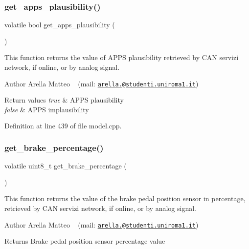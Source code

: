 \subsubsection{\texorpdfstring{get\+\_\+apps\+\_\+plausibility()}{get\_apps\_plausibility()}}
{\footnotesize\ttfamily volatile bool get\+\_\+apps\+\_\+plausibility (\begin{DoxyParamCaption}{ }\end{DoxyParamCaption})}



This function returns the value of A\+P\+PS plausibility retrieved by C\+AN servizi network, if online, or by analog signal. 

\begin{DoxyAuthor}{Author}
Arella Matteo ~\newline
 (mail\+: \href{mailto:arella.1646983@studenti.uniroma1.it}{\tt arella.@studenti.\+uniroma1.\+it})
\end{DoxyAuthor}

\begin{DoxyRetVals}{Return values}
{\em true} & A\+P\+PS plausibility \\
\hline
{\em false} & A\+P\+PS implausibility \\
\hline
\end{DoxyRetVals}


Definition at line 439 of file model.\+cpp.

\mbox{\label{group___board__model__group_ga6db41e7368919bc4dfafaf4e400ae1a9}} 
\subsubsection{\texorpdfstring{get\+\_\+brake\+\_\+percentage()}{get\_brake\_percentage()}}
{\footnotesize\ttfamily volatile uint8\+\_\+t get\+\_\+brake\+\_\+percentage (\begin{DoxyParamCaption}{ }\end{DoxyParamCaption})}



This function returns the value of the brake pedal position sensor in percentage, retrieved by C\+AN servizi network, if online, or by analog signal. 

\begin{DoxyAuthor}{Author}
Arella Matteo ~\newline
 (mail\+: \href{mailto:arella.1646983@studenti.uniroma1.it}{\tt arella.@studenti.\+uniroma1.\+it})
\end{DoxyAuthor}
\begin{DoxyReturn}{Returns}
Brake pedal position sensor percentage value 
\end{DoxyReturn}


